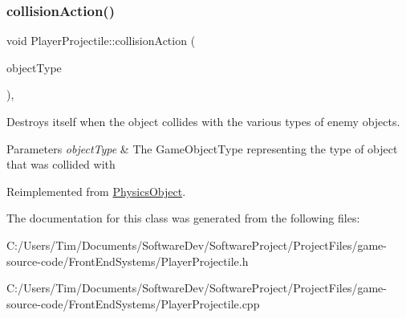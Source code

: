 \subsubsection{\texorpdfstring{collision\+Action()}{collisionAction()}}
{\footnotesize\ttfamily void Player\+Projectile\+::collision\+Action (\begin{DoxyParamCaption}\item[{const Game\+Object\+Type \&}]{object\+Type }\end{DoxyParamCaption})\hspace{0.3cm}{\ttfamily [override]}, {\ttfamily [virtual]}}



Destroys itself when the object collides with the various types of enemy objects. 


\begin{DoxyParams}{Parameters}
{\em object\+Type} & The Game\+Object\+Type representing the type of object that was collided with \\
\hline
\end{DoxyParams}


Reimplemented from \hyperlink{class_physics_object_a16163f4e5bf781b3814d024c9f44a276}{Physics\+Object}.



The documentation for this class was generated from the following files\+:\begin{DoxyCompactItemize}
\item 
C\+:/\+Users/\+Tim/\+Documents/\+Software\+Dev/\+Software\+Project/\+Project\+Files/game-\/source-\/code/\+Front\+End\+Systems/Player\+Projectile.\+h\item 
C\+:/\+Users/\+Tim/\+Documents/\+Software\+Dev/\+Software\+Project/\+Project\+Files/game-\/source-\/code/\+Front\+End\+Systems/Player\+Projectile.\+cpp\end{DoxyCompactItemize}
